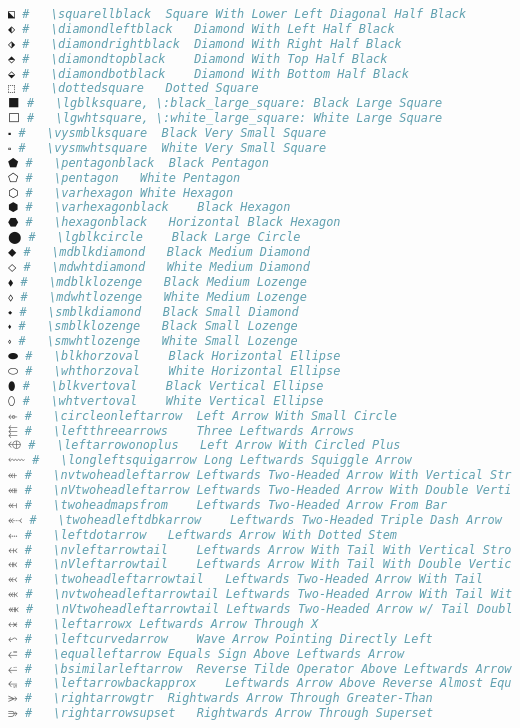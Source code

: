 \begin{lstlisting}[language=Julia, linewidth=\textwidth]
⬕ #   \squarellblack  Square With Lower Left Diagonal Half Black
⬖ #   \diamondleftblack   Diamond With Left Half Black
⬗ #   \diamondrightblack  Diamond With Right Half Black
⬘ #   \diamondtopblack    Diamond With Top Half Black
⬙ #   \diamondbotblack    Diamond With Bottom Half Black
⬚ #   \dottedsquare   Dotted Square
⬛ #   \lgblksquare, \:black_large_square: Black Large Square
⬜ #   \lgwhtsquare, \:white_large_square: White Large Square
⬝ #   \vysmblksquare  Black Very Small Square
⬞ #   \vysmwhtsquare  White Very Small Square
⬟ #   \pentagonblack  Black Pentagon
⬠ #   \pentagon   White Pentagon
⬡ #   \varhexagon White Hexagon
⬢ #   \varhexagonblack    Black Hexagon
⬣ #   \hexagonblack   Horizontal Black Hexagon
⬤ #   \lgblkcircle    Black Large Circle
⬥ #   \mdblkdiamond   Black Medium Diamond
⬦ #   \mdwhtdiamond   White Medium Diamond
⬧ #   \mdblklozenge   Black Medium Lozenge
⬨ #   \mdwhtlozenge   White Medium Lozenge
⬩ #   \smblkdiamond   Black Small Diamond
⬪ #   \smblklozenge   Black Small Lozenge
⬫ #   \smwhtlozenge   White Small Lozenge
⬬ #   \blkhorzoval    Black Horizontal Ellipse
⬭ #   \whthorzoval    White Horizontal Ellipse
⬮ #   \blkvertoval    Black Vertical Ellipse
⬯ #   \whtvertoval    White Vertical Ellipse
⬰ #   \circleonleftarrow  Left Arrow With Small Circle
⬱ #   \leftthreearrows    Three Leftwards Arrows
⬲ #   \leftarrowonoplus   Left Arrow With Circled Plus
⬳ #   \longleftsquigarrow Long Leftwards Squiggle Arrow
⬴ #   \nvtwoheadleftarrow Leftwards Two-Headed Arrow With Vertical Stroke
⬵ #   \nVtwoheadleftarrow Leftwards Two-Headed Arrow With Double Vertical Stroke
⬶ #   \twoheadmapsfrom    Leftwards Two-Headed Arrow From Bar
⬷ #   \twoheadleftdbkarrow    Leftwards Two-Headed Triple Dash Arrow
⬸ #   \leftdotarrow   Leftwards Arrow With Dotted Stem
⬹ #   \nvleftarrowtail    Leftwards Arrow With Tail With Vertical Stroke
⬺ #   \nVleftarrowtail    Leftwards Arrow With Tail With Double Vertical Stroke
⬻ #   \twoheadleftarrowtail   Leftwards Two-Headed Arrow With Tail
⬼ #   \nvtwoheadleftarrowtail Leftwards Two-Headed Arrow With Tail With Vertical Stroke
⬽ #   \nVtwoheadleftarrowtail Leftwards Two-Headed Arrow w/ Tail Double Vertical Stroke
⬾ #   \leftarrowx Leftwards Arrow Through X
⬿ #   \leftcurvedarrow    Wave Arrow Pointing Directly Left
⭀ #   \equalleftarrow Equals Sign Above Leftwards Arrow
⭁ #   \bsimilarleftarrow  Reverse Tilde Operator Above Leftwards Arrow
⭂ #   \leftarrowbackapprox    Leftwards Arrow Above Reverse Almost Equal To
⭃ #   \rightarrowgtr  Rightwards Arrow Through Greater-Than
⭄ #   \rightarrowsupset   Rightwards Arrow Through Superset

\end{lstlisting}
